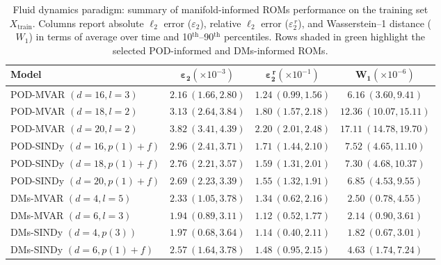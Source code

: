 \documentclass{article}
\begin{document}
\begin{table}[ht]
\centering
\setlength{\tabcolsep}{2pt}
{
\small
\begin{tabularx}{\textwidth}{lCCC}  
\toprule
\textbf{Model} & $\boldsymbol{\varepsilon_2} (\times 10^{-3})$ & $\boldsymbol{\varepsilon_2^{\,r}} (\times 10^{-1})$ & $\boldsymbol{W_1}  (\times 10^{-6})$ \\
\midrule
POD-MVAR $(d=16,l=3)$ & $2.16~(1.66,2.80)$ & $1.24~(0.99,1.56)$ & $6.16~(3.60,9.41)$\\


POD-MVAR $(d=18,l=2)$ & $3.13~(2.64,3.84)$ & $1.80~(1.57,2.18)$ & $12.36~(10.07,15.11)$\\


POD-MVAR $(d=20,l=2)$ & $3.82~(3.41,4.39)$ & $2.20~(2.01,2.48)$ & $17.11~(14.78,19.70)$\\


POD-SINDy $(d=16,p(1)+f)$ & $2.96~(2.41,3.71)$ & $1.71~(1.44,2.10)$ & $7.52~(4.65,11.10)$\\


POD-SINDy $(d=18,p(1)+f)$ & $2.76~(2.21,3.57)$ & $1.59~(1.31,2.01)$ & $7.30~(4.68,10.37)$\\


POD-SINDy $(d=20,p(1)+f)$ & $2.69~(2.23,3.39)$ & $1.55~(1.32,1.91)$ & $6.85~(4.53,9.55)$\\




DMs-MVAR $(d=4, l=5)$ & $2.33~(1.05,3.78)$ & $1.34~(0.62,2.16)$ & $2.50~(0.78,4.55)$\\


DMs-MVAR $(d=6, l=3)$ & $1.94~(0.89,3.11)$ & $1.12~(0.52,1.77)$ & $2.14~(0.90,3.61)$\\



DMs-SINDy $(d=4, p(3))$ & $1.97~(0.68,3.64)$ & $1.14~(0.40,2.11)$ & $1.82~(0.67,3.01)$\\


DMs-SINDy $(d=6, p(1) + f)$ & $2.57~(1.64,3.78)$ & $1.48~(0.95,2.15)$ & $4.63~(1.74,7.24)$\\


\bottomrule
\end{tabularx}
}
\caption{Fluid dynamics paradigm: summary of manifold-informed ROMs performance on the training set \(X_{\text{train}}\). Columns report absolute $\ell_2$ error ($\varepsilon_2$), relative $\ell_2$ error ($\varepsilon_2^{\,r}$), and Wasserstein–1 distance ($W_1$) in terms of average over time and 10$^{\text{th}}$–90$^{\text{th}}$ percentiles. Rows shaded in green highlight the selected POD-informed and DMs-informed ROMs.}
\label{tab:rom_metrics_train_new}
\end{table}
\end{document}
